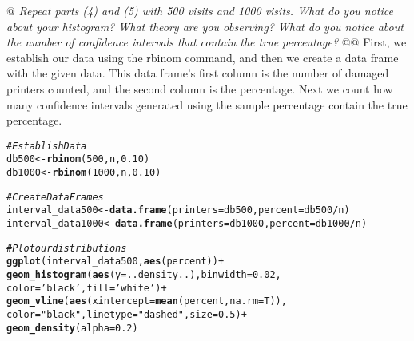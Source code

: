 \documentclass[10pt]{report}\usepackage[]{graphicx}\usepackage[]{xcolor}
\makeatletter
\newcommand{\hlnum}[1]{\textcolor[rgb]{0.686,0.059,0.569}{#1} }%
\newcommand{\hlstr}[1]{\textcolor[rgb]{0.192,0.494,0.8}{#1} }%
\newcommand{\hlcom}[1]{\textcolor[rgb]{0.678,0.584,0.686}{\textit{#1} } }%
\newcommand{\hlopt}[1]{\textcolor[rgb]{0,0,0}{#1} }%
\newcommand{\hlstd}[1]{\textcolor[rgb]{0.345,0.345,0.345}{#1} }%
\newcommand{\hlkwb}[1]{\textcolor[rgb]{0.69,0.353,0.396}{#1} }%
\newcommand{\hlkwc}[1]{\textcolor[rgb]{0.333,0.667,0.333}{#1} }%
\newcommand{\hlkwd}[1]{\textcolor[rgb]{0.737,0.353,0.396}{\textbf{#1} } }%
\newenvironment{kframe}{%
 \def\at@end@of@kframe{}%
 \ifinner\ifhmode%
  \def\at@end@of@kframe{\end{minipage} }%
  \begin{minipage}{\columnwidth}%
 \fi\fi%
 \def\FrameCommand##1{\hskip\@totalleftmargin \hskip-\fboxsep
 \colorbox{shadecolor}{##1}\hskip-\fboxsep
     \hskip-\linewidth \hskip-\@totalleftmargin \hskip\columnwidth}%
 \MakeFramed {\advance\hsize-\width
   \@totalleftmargin\z@ \linewidth\hsize
   \@setminipage} }%
 {\par\unskip\endMakeFramed%
 \at@end@of@kframe}
\newenvironment{knitrout}{}{} %
\makeatother
\begin{document}
\begin{easylist}[enumerate]
        \newpage
        @ \textit{Repeat parts (4) and (5) with 500 visits and 1000 visits. What do you notice about your histogram?
        What theory are you observing? What do you notice about the number of confidence intervals that contain the true
        percentage?}
        @@ First, we establish our data using the {\ttfamily rbinom} command, and then we create a data frame with the
        given data. This data frame's first column is the number of damaged printers counted, and the second column is
        the percentage. Next we count how many confidence intervals generated using the sample percentage contain the
        true percentage.

\begin{knitrout}
\color{fgcolor}\begin{kframe}
\begin{alltt}
         \hlcom{# Establish Data}
         \hlstd{db500} \hlkwb{<-} \hlkwd{rbinom}\hlstd{(}\hlnum{500}\hlstd{, n,} \hlnum{0.10}\hlstd{)}
         \hlstd{db1000} \hlkwb{<-} \hlkwd{rbinom}\hlstd{(}\hlnum{1000}\hlstd{, n,} \hlnum{0.10}\hlstd{)}

         \hlcom{# Create Data Frames}
         \hlstd{interval_data500} \hlkwb{<-} \hlkwd{data.frame}\hlstd{(}\hlkwc{printers}\hlstd{=db500,} \hlkwc{percent}\hlstd{=db500}\hlopt{/}\hlstd{n)}
         \hlstd{interval_data1000} \hlkwb{<-} \hlkwd{data.frame}\hlstd{(}\hlkwc{printers}\hlstd{=db1000,} \hlkwc{percent}\hlstd{=db1000}\hlopt{/}\hlstd{n)}

         \hlcom{# Plot our distributions}
         \hlkwd{ggplot}\hlstd{(interval_data500,} \hlkwd{aes}\hlstd{(percent))} \hlopt{+}
                    \hlkwd{geom_histogram}\hlstd{(}\hlkwd{aes}\hlstd{(}\hlkwc{y}\hlstd{=..density..),} \hlkwc{binwidth}\hlstd{=}\hlnum{0.02}\hlstd{,}
                                   \hlkwc{color}\hlstd{=}\hlstr{'black'}\hlstd{,} \hlkwc{fill}\hlstd{=}\hlstr{'white'}\hlstd{)} \hlopt{+}
                    \hlkwd{geom_vline}\hlstd{(}\hlkwd{aes}\hlstd{(}\hlkwc{xintercept}\hlstd{=}\hlkwd{mean}\hlstd{(percent,} \hlkwc{na.rm}\hlstd{=T)),}
                               \hlkwc{color}\hlstd{=}\hlstr{"black"}\hlstd{,} \hlkwc{linetype}\hlstd{=}\hlstr{"dashed"}\hlstd{,} \hlkwc{size}\hlstd{=}\hlnum{0.5}\hlstd{)} \hlopt{+}
                    \hlkwd{geom_density}\hlstd{(}\hlkwc{alpha}\hlstd{=}\hlnum{0.2}\hlstd{)}


\end{alltt}
\end{kframe}
\end{knitrout}
\end{easylist}
\end{document}
